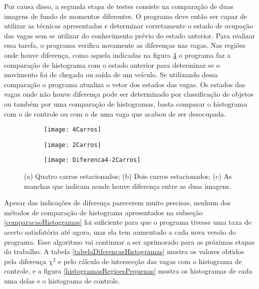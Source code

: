 Por causa disso, a segunda etapa de testes consiste na comparação de duas imagens de fundo de momentos diferentes. O programa deve então ser capaz de utilizar as técnicas apresentadas e determinar corretamente o estado de ocupação das vagas sem se utilizar do conhecimento prévio do estado anterior. Para realizar essa tarefa, o programa verifica novamente as diferenças nas vagas. Nas regiões onde houve diferença, como aquela indicadas na figura \ref{regioesDiferencaTesteFig} o programa faz a comparação de histograma com o estado anterior para determinar se o movimento foi de chegada ou saída de um veículo. Se utilizando dessa comparação o programa atualiza o vetor dos estados das vagas. Os estados das vagas onde não houve diferença pode ser determinado por classificação de objetos ou também por uma comparação de histogramas, basta comparar o histograma com o de controle ou com o de uma vaga que acabou de ser desocupada.


\begin{figure}
 \centering
 \begin{subfigure}{.5\textwidth}
  \centering
  \texttt{[image: 4Carros]}
  \caption{}
  \label{regioesDiferencaTesteFig:sfig1}
\end{subfigure}%
\begin{subfigure}{.5\textwidth}
  \centering
  \texttt{[image: 2Carros]}
  \caption{}
  \label{regioesDiferencaTesteFig:sfig2}
\end{subfigure}

 \begin{subfigure}{.5\textwidth}
  \centering
  \texttt{[image: Diferenca4-2Carros]}
  \caption{}
  \label{regioesDiferencaTesteFig:sfig3}
\end{subfigure}%


\caption{(a) Quatro carros estacionados; (b) Dois carros estacionados; (c) As manchas que indicam aonde houve diferença entre as duas imagens.}
\label{regioesDiferencaTesteFig}
\end{figure}

Apesar das indicações de diferença parecerem muito precisas, nenhum dos métodos de comparação de histograma apresentados na subseção \ref{comparacaoHistogramas} foi suficiente para que o programa tivesse uma taxa de acerto satisfatória até agora, mas ela tem aumentado a cada nova versão do programa. Esse algoritmo vai continuar a ser aprimorado para as próximas etapas do trabalho. A tabela \ref{tabelaDiferencasHistogramas} mostra os valores obtidos pela diferença $\chi^2$ e pelo cálculo de intersecção das vagas com o histograma de controle, e a figura \ref{histogramasRegioesPequenas} mostra os histogramas de cada uma delas e o histograma de controle.

